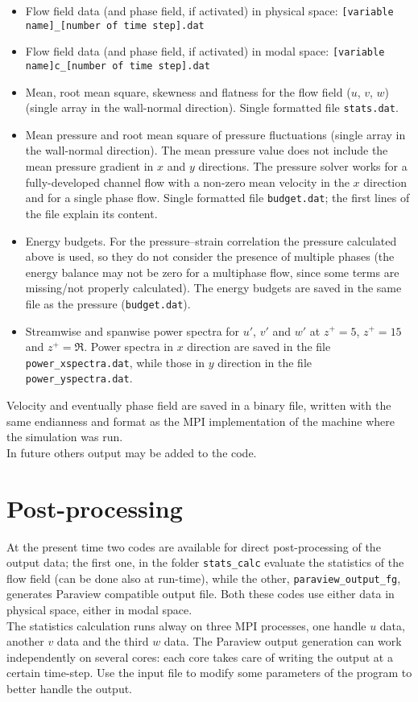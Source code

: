 \begin{itemize}
\item Flow field data (and phase field, if activated) in physical space: \texttt{[variable name]\_[number of time step].dat}
\item Flow field data (and phase field, if activated) in modal space: \texttt{[variable name]c\_[number of time step].dat}
\item Mean, root mean square, skewness and flatness for the flow field ($u$, $v$, $w$) (single array in the wall-normal direction). Single formatted file \texttt{stats.dat}.
\item Mean pressure and root mean square of pressure fluctuations (single array in the wall-normal direction). The mean pressure value does not include the mean pressure gradient in $x$ and $y$ directions. The pressure solver works for a fully-developed channel flow with a non-zero mean velocity in the $x$ direction and for a single phase flow. Single formatted file \texttt{budget.dat}; the first lines of the file explain its content.
\item Energy budgets. For the pressure--strain correlation the pressure calculated above is used, so they do not consider the presence of multiple phases (the energy balance may not be zero for a multiphase flow, since some terms are missing/not properly calculated). The energy budgets are saved in the same file as the pressure (\texttt{budget.dat}).
\item Streamwise and spanwise power spectra for $u'$, $v'$ and $w'$ at $z^+=5$, $z^+=15$ and $z^+=\Re$. Power spectra in $x$ direction are saved in the file \texttt{power\_xspectra.dat}, while those in $y$ direction in the file \texttt{power\_yspectra.dat}.
\end{itemize}
Velocity and eventually phase field are saved in a binary file, written with the same endianness and format as the MPI implementation of the machine where the simulation was run.\\
In future others output may be added to the code.

\section{Post-processing}
At the present time two codes are available for direct post-processing of the output data; the first one, in the folder \texttt{stats\_calc} evaluate the statistics of the flow field (can be done also at run-time), while the other, \texttt{paraview\_output\_fg}, generates Paraview compatible output file. Both these codes use either data in physical space, either in modal space.\\
The statistics calculation runs alway on three MPI processes, one handle $u$ data, another $v$ data and the third $w$ data. The Paraview output generation can work independently on several cores: each core takes care of writing the output at a certain time-step. Use the input file to modify some parameters of the program to better handle the output.

